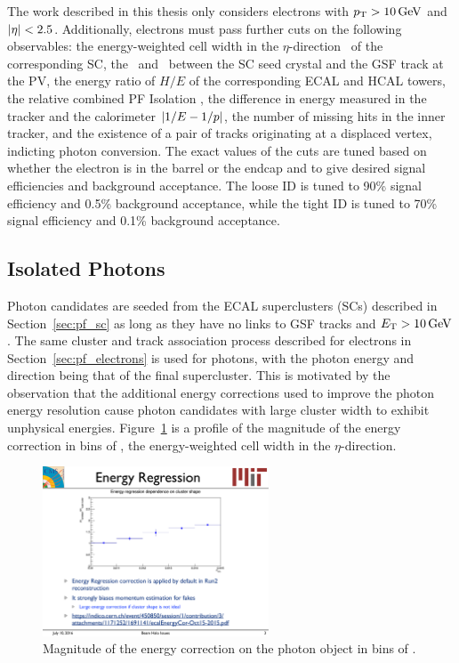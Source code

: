 The work described in this thesis only considers electrons with $p_{\mathrm{T}} > 10\,\text{Ge\hspace{-.08em}V}$ and $\lvert \eta \rvert < 2.5$.
Additionally, electrons must pass further cuts on the following observables:
the energy-weighted cell width in the $\eta$-direction \sieie\ of the corresponding SC,
the \deta\ and \dphi\ between the SC seed crystal and the GSF track at the PV,
the energy ratio of $H/E$ of the corresponding ECAL and HCAL towers,
the relative combined PF Isolation \IPF,
the difference in energy measured in the tracker and the calorimeter $\lvert 1/E - 1/p \rvert$,
the number of missing hits in the inner tracker,
and the existence of a pair of tracks originating at a displaced vertex, indicting photon conversion.
The exact values of the cuts are tuned based on whether the electron is in the barrel or the endcap and to give desired signal efficiencies and background acceptance.
The loose ID is tuned to 90\% signal efficiency and 0.5\% background acceptance, while the tight ID is tuned to 70\% signal efficiency and 0.1\% background acceptance.

\subsection{Isolated Photons}
\label{sec:pf_photons}

Photon candidates are seeded from the ECAL superclusters (SCs) described in Section~\ref{sec:pf_sc} as long as they have no links to GSF tracks and $E_{\mathrm{T}} > 10\,\text{Ge\hspace{-.08em}V}$. 
The same cluster and track association process described for electrons in Section~\ref{sec:pf_electrons} is used for photons, with the photon energy and direction being that of the final supercluster.
This is motivated by the observation that the additional energy corrections used to improve the photon energy resolution cause photon candidates with large cluster width to exhibit unphysical energies. 
Figure~\ref{fig:corr_vs_sieie} is a profile of the magnitude of the energy correction in bins of \sieie, the energy-weighted cell width in the $\eta$-direction.

\begin{figure}[htbp]
  \begin{center}
    \includegraphics[width=0.6\textwidth]{Reconstruction/Figures/corr_vs_sieie.pdf}
    \caption{
      Magnitude of the energy correction on the photon object in bins of \sieie.
    }
    \label{fig:corr_vs_sieie}
  \end{center}
\end{figure}

